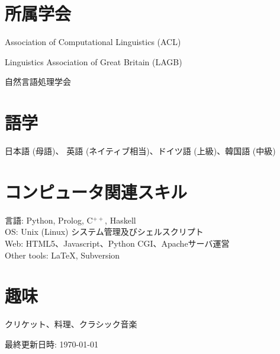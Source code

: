 \documentclass[a4paper]{article}
\def\website{{\tt\small http://homepages.stca.herts.ac.uk/\textasciitilde{}ys08aah}\\{&\tt\small http://www.satoama.co.uk/personal}}
\begin{document}
\section*{所属学会}

Association of Computational Linguistics (ACL)

Linguistics Association of Great Britain (LAGB)

自然言語処理学会

\section*{語学}

日本語 (母語)、 英語 (ネイティブ相当)、ドイツ語 (上級)、韓国語 (中級)


\section*{コンピュータ関連スキル}

言語: Python, Prolog, C$^{++}$, Haskell\\
OS: Unix (Linux) システム管理及びシェルスクリプト\\
Web: HTML5、Javascript、Python CGI、Apacheサーバ運営\\
Other tools: \LaTeX, Subversion



\section*{趣味}
クリケット、料理、クラシック音楽


\begin{center}
  \begin{footnotesize}
    最終更新日時: \today%
  \end{footnotesize}
\end{center}
\end{document}
